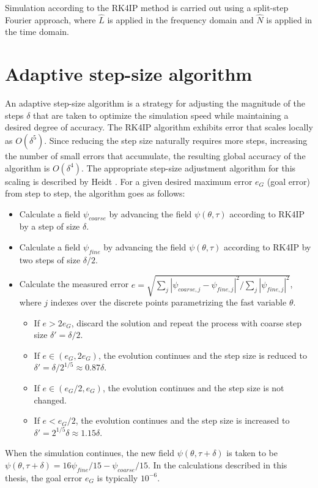 Simulation according to the RK4IP method is carried out using a split-step Fourier approach, where $\hat{L}$ is applied in the frequency domain and $\hat{N}$ is applied in the time domain.

\section{Adaptive step-size algorithm}

An adaptive step-size algorithm is a strategy for adjusting the magnitude of the steps $\delta$ that are taken to optimize the simulation speed while maintaining a desired degree of accuracy. The RK4IP algorithm exhibits error that scales locally as $O(\delta^5)$. Since reducing the step size naturally requires more steps, increasing the number of small errors that accumulate, the resulting global accuracy of the algorithm is $O(\delta^4)$. The appropriate step-size adjustment algorithm for this scaling is described by Heidt \cite{Heidt2009}. For a given desired maximum error $e_G$ (goal error) from step to step, the algorithm goes as follows:
\begin{itemize}
	\item Calculate a field $\psi_{coarse}$ by advancing the field $\psi(\theta,\tau)$ according to RK4IP by a step of size $\delta$.
	\item Calculate a field $\psi_{fine}$ by advancing the field $\psi(\theta,\tau)$ according to RK4IP by two steps of size $\delta/2$. 
	\item Calculate the measured error $e=\sqrt{\sum_j |\psi_{coarse,j}-\psi_{fine,j}|^2/\sum_j|\psi_{fine,j}|^2}$, where $j$ indexes over the discrete points parametrizing the fast variable $\theta$. 
	\begin{itemize}
		\item If $e>2e_G$, discard the solution and repeat the process with coarse step size $\delta'=\delta/2$.
		\item If $e\in(e_G,2e_G)$, the evolution continues and the step size is reduced to $\delta'=\delta/2^{1/5}\approx0.87\delta$. 
		\item If $e\in(e_G/2,e_G)$, the evolution continues and the step size is not changed.
		\item If $e<e_G/2$, the evolution continues and the step size is increased to $\delta'=2^{1/5}\delta\approx1.15\delta$.
		\end{itemize}
\end{itemize}

When the simulation continues, the new field $\psi(\theta,\tau+\delta)$ is taken to be $\psi(\theta,\tau+\delta)=16\psi_{fine}/15-\psi_{coarse}/15$. In the calculations described in this thesis, the goal error $e_G$ is typically $10^{-6}$.

